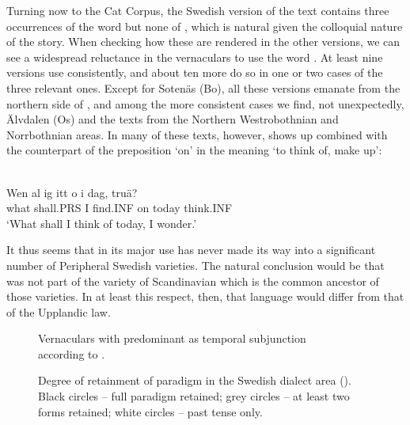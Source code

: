 Turning now to the Cat Corpus, the Swedish version of the text contains three occurrences of the word  but none of , which is natural given the colloquial nature of the story. When checking how these are rendered in the other versions, we can see a widespread reluctance in the vernaculars to use the word . At least nine versions use  consistently, and about ten more do so in one or two cases of the three relevant ones. Except for Sotenäs (Bo), all these versions emanate from the northern side of , and among the more consistent cases we find, not unexpectedly, Älvdalen (Os) and the texts from the Northern Westrobothnian and Norrbothnian areas. In many of these texts, however,  shows up combined with the counterpart of the preposition  ‘on’ in the meaning ‘to think of, make up’:


\ea\label{}
\\
\gll Wen  al  ig  itt  o  {i dag},  truä?\\
what  shall.PRS  I  find.INF  on  today  think.INF\\
\glt ‘What shall I think of today, I wonder.’
\z

It thus seems that  in its major use has never made its way into a significant number of Peripheral Swedish varieties. The natural conclusion would be that  was not part of the variety of Scandinavian which is the common ancestor of those varieties. In at least this respect, then, that language would differ from that of the Upplandic law. 


\begin{figure}[h]
\caption{Vernaculars with predominant as temporal subjunction\\
 according to \citet{Vallmark1937}.  }
\label{map:6:30}
\end{figure}

\begin{figure}[h]
\caption{Degree of retainment of paradigm in the Swedish dialect area (\citet{Markey1969}). Black circles – full paradigm retained; grey circles – at least two forms retained; white circles – past tense only. }
\label{map:6:31}
\end{figure}

